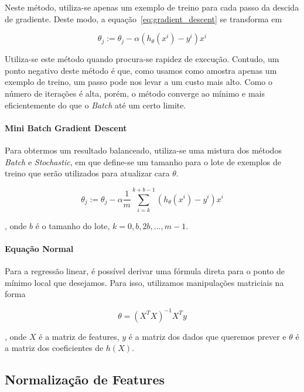 \documentclass[conference]{IEEEtran}
\begin{document}
Neste método, utiliza-se apenas um exemplo de treino para cada passo da descida de gradiente. Deste modo, a equação~\ref{eq:gradient_descent} se transforma em

\begin{equation} \label{eq:stochastic_descent}
\theta_{j} := \theta_{j} - \alpha(h_{\theta}(x^{i}) - y^{i}) x^{i}
\end{equation}

Utiliza-se este método quando procura-se rapidez de execução. Contudo, um ponto negativo deste método é que, como usamos como amostra apenas um exemplo de treino, um passo pode nos levar a um custo mais alto. Como o número de iterações é alta, porém, o método converge ao mínimo e mais eficientemente do que o \textit{Batch} até um certo limite.

\paragraph{Mini Batch Gradient Descent}

Para obtermos um resultado balanceado, utiliza-se uma mistura dos métodos \textit{Batch} e \textit{Stochastic}, em que define-se um tamanho para o lote de exemplos de treino que serão utilizados para atualizar cara $\theta$.

\begin{equation} \label{eq:minibatch_descent}
\theta_{j} := \theta_{j} - \alpha \dfrac{1}{m} \sum_{i=k}^{k+b-1}(h_{\theta}(x^{i}) - y^{i}) x^{i}
\end{equation}

, onde $b$ é o tamanho do lote, $k = 0, b, 2b, ..., m-1$.

\paragraph{Equação Normal}

Para a regressão linear, é possível derivar uma fórmula direta para o ponto de mínimo local que desejamos. Para isso, utilizamos manipulações matriciais na forma~\cite{ayearofai}

\begin{equation} \label{eq:normal}
\theta = (X^{T}X)^{-1}X^{T}y
\end{equation}

, onde $X$ é a matriz de features, $y$ é a matriz dos dados que queremos prever e $\theta$ é a matriz dos coeficientes de $h(X)$.

\subsection{Normalização de Features}
\end{document}

